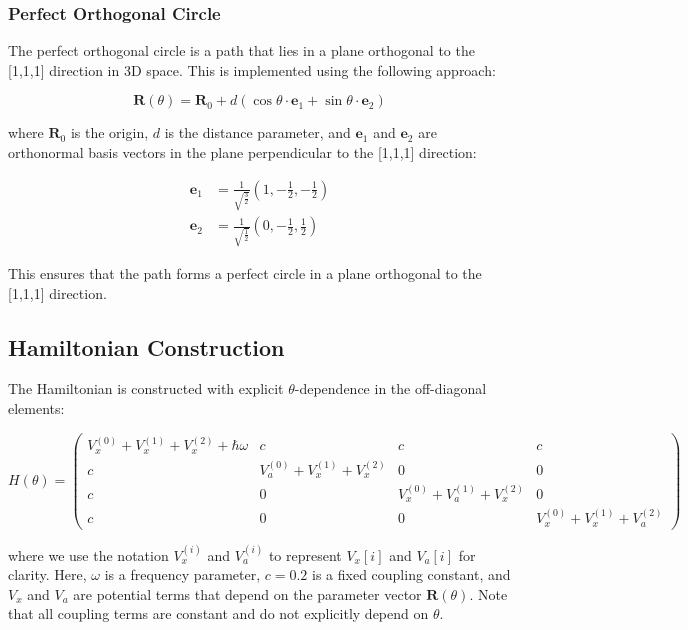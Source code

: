 \documentclass[12pt,a4paper]{article}
\begin{document}
\subsubsection{Perfect Orthogonal Circle}

The perfect orthogonal circle is a path that lies in a plane orthogonal to the [1,1,1] direction in 3D space. This is implemented using the following approach:

\begin{equation}
\bm{R}(\theta) = \bm{R}_0 + d (\cos\theta \cdot \bm{e}_1 + \sin\theta \cdot \bm{e}_2)
\end{equation}

where $\bm{R}_0$ is the origin, $d$ is the distance parameter, and $\bm{e}_1$ and $\bm{e}_2$ are orthonormal basis vectors in the plane perpendicular to the [1,1,1] direction:

\begin{align}
\bm{e}_1 &= \frac{1}{\sqrt{\frac{3}{2}}}(1, -\frac{1}{2}, -\frac{1}{2}) \\
\bm{e}_2 &= \frac{1}{\sqrt{\frac{1}{2}}}(0, -\frac{1}{2}, \frac{1}{2})
\end{align}

This ensures that the path forms a perfect circle in a plane orthogonal to the [1,1,1] direction.

\subsection{Hamiltonian Construction}

The Hamiltonian is constructed with explicit $\theta$-dependence in the off-diagonal elements:

\begin{equation}
H(\theta) = \begin{pmatrix}
\scriptstyle V_x^{(0)} + V_x^{(1)} + V_x^{(2)} + \hbar\omega & \scriptstyle c & \scriptstyle c & \scriptstyle c \\
\scriptstyle c & \scriptstyle V_a^{(0)} + V_x^{(1)} + V_x^{(2)} & \scriptstyle 0 & \scriptstyle 0 \\
\scriptstyle c & \scriptstyle 0 & \scriptstyle V_x^{(0)} + V_a^{(1)} + V_x^{(2)} & \scriptstyle 0 \\
\scriptstyle c & \scriptstyle 0 & \scriptstyle 0 & \scriptstyle V_x^{(0)} + V_x^{(1)} + V_a^{(2)}
\end{pmatrix}
\end{equation}

where we use the notation $V_x^{(i)}$ and $V_a^{(i)}$ to represent $V_x[i]$ and $V_a[i]$ for clarity. Here, $\omega$ is a frequency parameter, $c = 0.2$ is a fixed coupling constant, and $V_x$ and $V_a$ are potential terms that depend on the parameter vector $\bm{R}(\theta)$. Note that all coupling terms are constant and do not explicitly depend on $\theta$.
\end{document}
